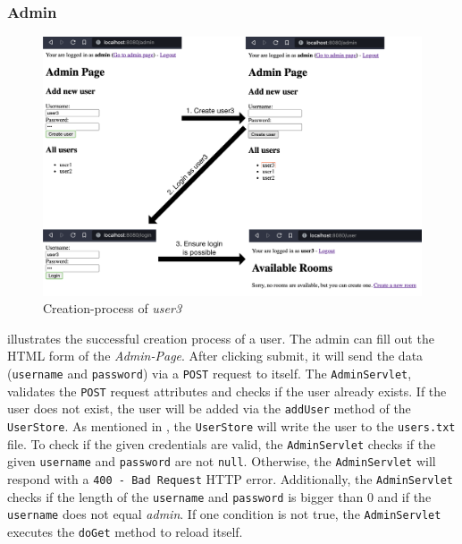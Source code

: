\subsubsection{Admin}\label{subsubsec:03_impl_servlets_admin}
\begin{figure}[h]
\centering
\includegraphics[scale=0.1]{images/03_impl/admin/create_user_all}
\caption{Creation-process of \textit{user3}}
\label{fig:03_impl_servlets_room_createall}
\end{figure}
 illustrates the successful creation process of a user.
The admin can fill out the HTML form of the \textit{Admin-Page}. After clicking submit, it will send the data (\texttt{username} and \texttt{password}) via a \texttt{POST} request to itself.
The \texttt{AdminServlet}, validates the \texttt{POST} request attributes and checks if the user already exists. If the user does not exist, the user will be added via the \texttt{addUser} method of the \texttt{UserStore}. As mentioned in , the \texttt{UserStore} will write the user to the \texttt{users.txt} file.
To check if the given credentials are valid, the \texttt{AdminServlet} checks if the given \texttt{username} and \texttt{password} are not \texttt{null}. Otherwise, the \texttt{AdminServlet} will respond with a \texttt{400 - Bad Request} HTTP error. Additionally, the \texttt{AdminServlet} checks if the length of the \texttt{username} and \texttt{password} is bigger than 0 and if the \texttt{username} does not equal \textit{admin}. If one condition is not true, the \texttt{AdminServlet} executes the \texttt{doGet} method to reload itself.


